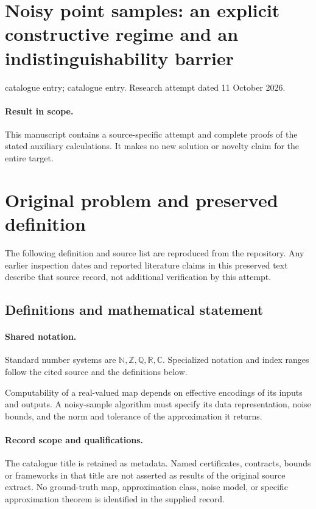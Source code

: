 \documentclass[11pt]{article}
\begin{document}
\section*{Noisy point samples: an explicit constructive regime and an indistinguishability barrier}
\noindent catalogue entry; catalogue entry. Research attempt dated 11 October 2026.
\paragraph{Result in scope.}This manuscript contains a source-specific attempt and complete proofs of the stated auxiliary calculations. It makes no new solution or novelty claim for the entire target.
\section{Original problem and preserved definition}
The following definition and source list are reproduced from the repository. Any earlier inspection dates and reported literature claims in this preserved text describe that source record, not additional verification by this attempt.
\subsection{Definitions and mathematical statement}

\paragraph{Shared notation.}Standard number systems are $\mathbb N,\mathbb Z,\mathbb Q,\mathbb R,\mathbb C$. Specialized notation and index ranges follow the cited source and the definitions below.


Computability of a real-valued map depends on effective encodings of its inputs and outputs. A noisy-sample algorithm must specify its data representation, noise bounds, and the norm and tolerance of the approximation it returns.
\paragraph{Record scope and qualifications.}
The catalogue title is retained as metadata. Named certificates, contracts, bounds or frameworks in that title are not asserted as results of the original source extract.
No ground-truth map, approximation class, noise model, or specific approximation theorem is identified in the supplied record.
\end{document}
